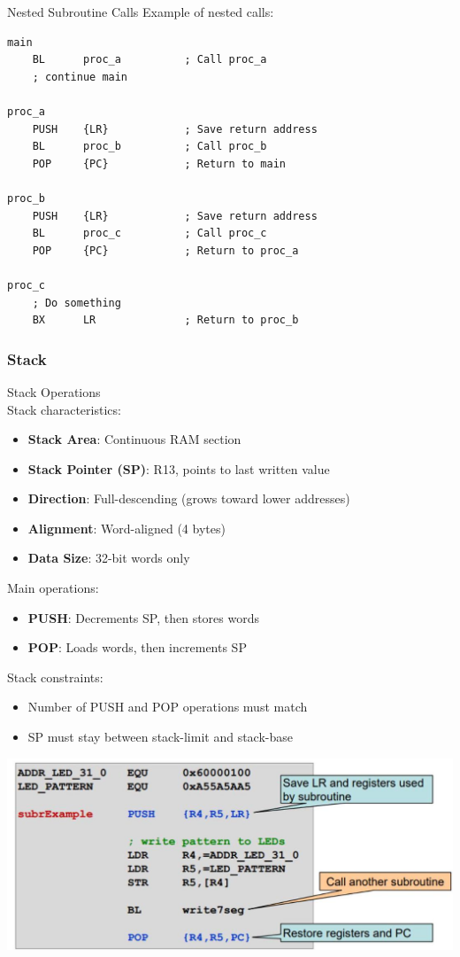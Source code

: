 \begin{example2}{Nested Subroutine Calls}
Example of nested calls:
\begin{lstlisting}[language=armasm, style=basesmol]
main
    BL      proc_a          ; Call proc_a
    ; continue main
    
proc_a
    PUSH    {LR}            ; Save return address
    BL      proc_b          ; Call proc_b
    POP     {PC}            ; Return to main
    
proc_b
    PUSH    {LR}            ; Save return address
    BL      proc_c          ; Call proc_c
    POP     {PC}            ; Return to proc_a
    
proc_c
    ; Do something
    BX      LR              ; Return to proc_b
\end{lstlisting}
\end{example2}

\subsubsection{Stack}

\begin{definition}{Stack Operations}\\
Stack characteristics:
\begin{itemize}
  \item \textbf{Stack Area}: Continuous RAM section
  \item \textbf{Stack Pointer (SP)}: R13, points to last written value
  \item \textbf{Direction}: Full-descending (grows toward lower addresses)
  \item \textbf{Alignment}: Word-aligned (4 bytes)
  \item \textbf{Data Size}: 32-bit words only
\end{itemize}

Main operations:
\begin{itemize}
  \item \textbf{PUSH}: Decrements SP, then stores words
  \item \textbf{POP}: Loads words, then increments SP
\end{itemize}

Stack constraints:
\begin{itemize}
  \item Number of PUSH and POP operations must match
  \item SP must stay between stack-limit and stack-base
\end{itemize}

\includegraphics[width=\linewidth]{images/2024_12_29_79e6b22f503fb7b4f718g-08}
\end{definition}

